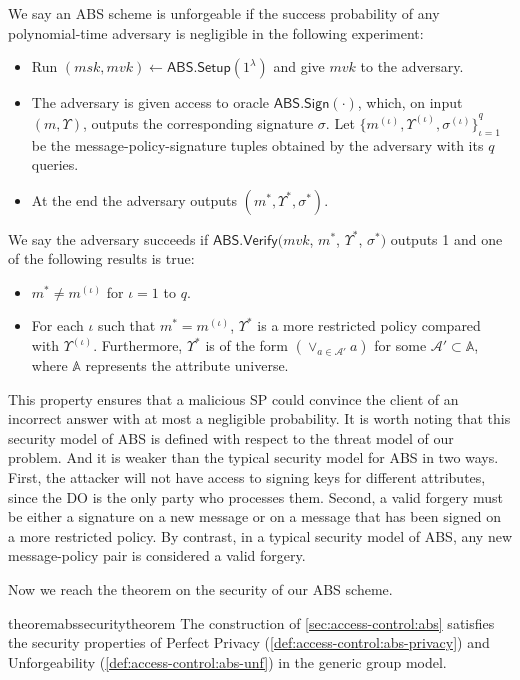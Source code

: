 \begin{definition}[Unforgeability]\label{def:access-control:abs-unf}
  We say an ABS scheme is unforgeable if the success probability of any polynomial-time adversary is negligible in the following experiment:
  \begin{itemize}
    \item Run $(msk, mvk) \gets \textsf{ABS.Setup}(1^\lambda)$ and give $mvk$ to the adversary.
    \item The adversary is given access to oracle $\textsf{ABS.Sign}(\cdot)$, which, on input $(m, \Upsilon)$, outputs the corresponding signature $\sigma$.
      Let ${\{m^{(\iota)}, \Upsilon^{(\iota)}, \sigma^{(\iota)}\}}_{\iota=1}^q$ be the message-policy-signature tuples obtained by the adversary with its $q$ queries.
    \item At the end the adversary outputs $(m^*, \Upsilon^*, \sigma^*)$.
  \end{itemize}
  We say the adversary succeeds if $\textsf{ABS.Verify}(mvk$, $m^*$, $\Upsilon^*$, $\sigma^*)$ outputs 1 and one of the following results is true:
  \begin{itemize}
    \item $m^\ast \neq m^{(\iota)}$ for $\iota=1$ to $q$.
    \item For each $\iota$ such that $m^\ast = m^{(\iota)}$, $\Upsilon^\ast$ is a more restricted policy compared with $\Upsilon^{(\iota)}$. Furthermore, $\Upsilon^\ast$ is of the form
      $(\lor_{a \in \mathcal{A}'} a)$ for some $\mathcal{A'} \subset \mathbb{A}$, where $\mathbb{A}$ represents the attribute universe.
  \end{itemize}
\end{definition}
This property ensures that a malicious SP could convince the client of an incorrect answer with at most a negligible probability.
It is worth noting that this security model of ABS is defined with respect to the threat model of our problem. And it is weaker than the typical security model for ABS in two ways. First, the attacker will not have access to signing keys for different attributes, since the DO is the only party who processes them. Second, a valid forgery must be either a signature on a new message or on a message that has been signed on a more restricted policy. By contrast, in a typical security model of ABS, any new message-policy pair is considered a valid forgery.

Now we reach the theorem on the security of our ABS scheme.

\begin{restatable}{theorem}{abssecuritytheorem}\label{thm:access-control:abs-sec}
  The construction of \cref{sec:access-control:abs} satisfies the security properties of Perfect Privacy (\cref{def:access-control:abs-privacy}) and Unforgeability (\cref{def:access-control:abs-unf}) in the generic group model.
\end{restatable}

